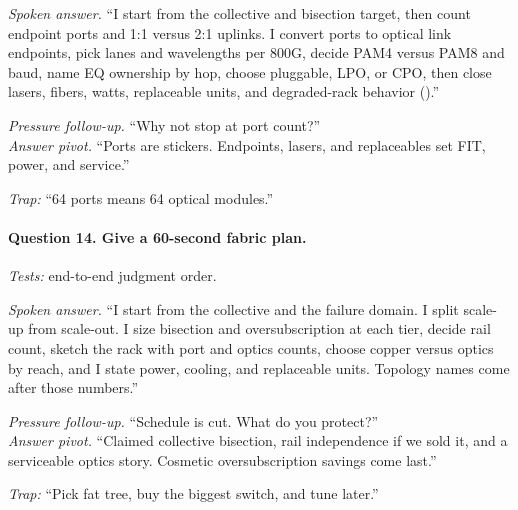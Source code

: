 \textit{Spoken answer.}
``I start from the collective and bisection target, then count endpoint ports
and 1:1 versus 2:1 uplinks. I convert ports to optical link endpoints, pick
lanes and wavelengths per 800G, decide PAM4 versus PAM8 and baud, name EQ
ownership by hop, choose pluggable, LPO, or CPO, then close lasers, fibers,
watts, replaceable units, and degraded-rack behavior
().''

\textit{Pressure follow-up.} ``Why not stop at port count?''\\
\textit{Answer pivot.} ``Ports are stickers. Endpoints, lasers, and
replaceables set FIT, power, and service.''

\textit{Trap:} ``64 ports means 64 optical modules.''

\paragraph{Question 14. Give a 60-second fabric plan.}
\textit{Tests:} end-to-end judgment order.

\textit{Spoken answer.}
``I start from the collective and the failure domain. I split scale-up from
scale-out. I size bisection and oversubscription at each tier, decide rail
count, sketch the rack with port and optics counts, choose copper versus optics
by reach, and I state power, cooling, and replaceable units. Topology names
come after those numbers.''

\textit{Pressure follow-up.} ``Schedule is cut. What do you protect?''\\
\textit{Answer pivot.} ``Claimed collective bisection, rail independence if we
sold it, and a serviceable optics story. Cosmetic oversubscription savings
come last.''

\textit{Trap:} ``Pick fat tree, buy the biggest switch, and tune later.''
